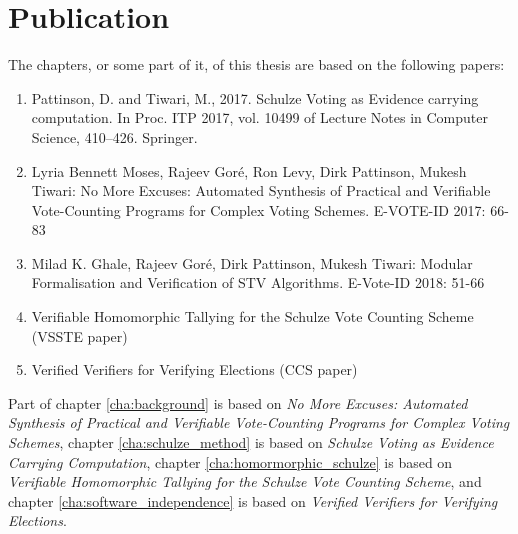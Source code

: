 \section{Publication}
 The chapters, or some part of it,  of this thesis are based on the following papers:
	\begin{enumerate}
	\item Pattinson, D. and Tiwari, M., 2017. Schulze Voting as Evidence carrying computation. In Proc. 
	ITP 2017, vol. 10499 of Lecture Notes in Computer Science, 410–426. Springer. 
	\item Lyria Bennett Moses, Rajeev Goré, Ron Levy, Dirk Pattinson, Mukesh Tiwari:
	No More Excuses: Automated Synthesis of Practical and Verifiable Vote-Counting Programs for Complex 
	Voting 	Schemes. E-VOTE-ID 2017: 66-83
	\item Milad K. Ghale, Rajeev Goré, Dirk Pattinson, Mukesh Tiwari:
	Modular Formalisation and Verification of STV Algorithms. E-Vote-ID 2018: 51-66
	\item Verifiable Homomorphic Tallying for the 
 		Schulze Vote Counting Scheme (VSSTE paper)
	\item Verified Verifiers for Verifying Elections (CCS paper)
	\end{enumerate}
 \noindent
 Part of chapter \ref{cha:background} is based on \textit{No More Excuses: Automated Synthesis of Practical 
 and Verifiable Vote-Counting Programs for Complex Voting  Schemes},
 chapter \ref{cha:schulze_method} is based on \textit{Schulze Voting as Evidence Carrying Computation},
 chapter \ref{cha:homormorphic_schulze} is based on \textit{Verifiable Homomorphic Tallying for the 
 Schulze Vote Counting Scheme}, and chapter
 \ref{cha:software_independence} is based on \textit{ Verified Verifiers for Verifying Elections}.





